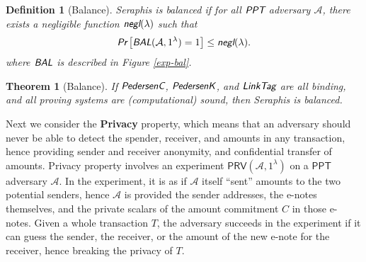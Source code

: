 \documentclass{article}
\theoremstyle{plain}
\newtheorem{definition}{Definition}[section]
\newtheorem{theorem}{Theorem}[section]
\theoremstyle{remark}
\begin{document}
\begin{definition}[Balance]
Seraphis is balanced if for all $\emph{\textsf{PPT}}$ adversary $\mathcal{A}$, there exists a negligible function $\emph{\textsf{negl}}(\lambda)$ such that
\begin{align*}
\emph{\textsf{Pr}}
\left[
\emph{\textsf{BAL}}(\mathcal{A}, 1^{\lambda})=1
\right]
\le \emph{\textsf{negl}}(\lambda).
\end{align*}
where $\emph{\textsf{BAL}}$ is described in Figure \ref{exp-bal}.
\end{definition}
\begin{theorem}[Balance]\label{thm-bal}
If $\emph{\textsf{PedersenC}}$, $\emph{\textsf{PedersenK}}$, and $\emph{\textsf{LinkTag}}$ are all binding, and all proving systems are (computational) sound, then Seraphis is balanced.  
\end{theorem}
Next we consider the \textbf{Privacy} property, which means that an adversary should never be able to detect the spender, receiver, and amounts in any transaction, hence providing sender and receiver anonymity, and confidential transfer of amounts. Privacy property involves an experiment $\textsf{PRV}(\mathcal{A}, 1^{\lambda})$ on a $\textsf{PPT}$ adversary $\mathcal{A}$. In the experiment, it is as if $\mathcal{A}$ itself ``sent'' amounts to the two potential senders, hence $\mathcal{A}$ is provided the sender addresses, the e-notes themselves, and the private scalars of the amount commitment $C$ in those e-notes. Given a whole transaction $T$, the adversary succeeds in the experiment if it can guess the sender, the receiver, or the amount of the new e-note for the receiver, hence breaking the privacy of $T$.
\end{document}
